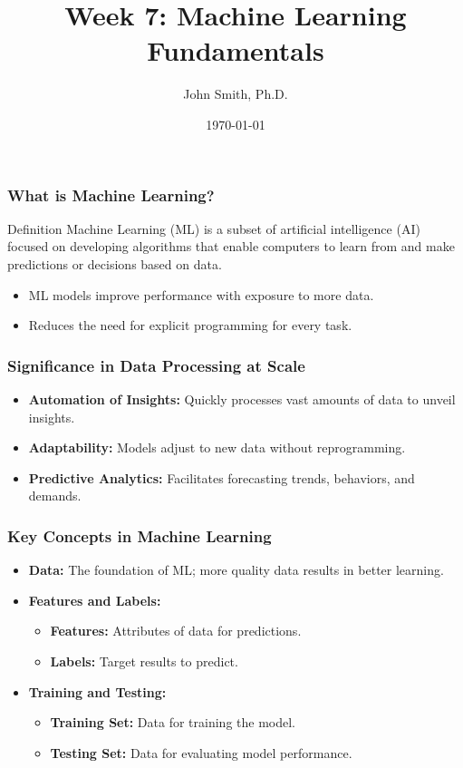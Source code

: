 \documentclass[aspectratio=169]{beamer}
\title[Machine Learning Fundamentals]{Week 7: Machine Learning Fundamentals}
\author[J. Smith]{John Smith, Ph.D.}
\institute[University Name]{
  Department of Computer Science\\
  University Name\\
  \vspace{0.3cm}
  Email: email@university.edu\\
  Website: www.university.edu
}
\date{\today}
\begin{document}
\frame{\titlepage}

\begin{frame}[fragile]
    \titlepage
\end{frame}

\begin{frame}[fragile]
    \frametitle{What is Machine Learning?}
    \begin{block}{Definition}
        Machine Learning (ML) is a subset of artificial intelligence (AI) focused on developing algorithms that enable computers to learn from and make predictions or decisions based on data. 
    \end{block}
    \begin{itemize}
        \item ML models improve performance with exposure to more data.
        \item Reduces the need for explicit programming for every task.
    \end{itemize}
\end{frame}

\begin{frame}[fragile]
    \frametitle{Significance in Data Processing at Scale}
    \begin{itemize}
        \item \textbf{Automation of Insights:} Quickly processes vast amounts of data to unveil insights.
        \item \textbf{Adaptability:} Models adjust to new data without reprogramming.
        \item \textbf{Predictive Analytics:} Facilitates forecasting trends, behaviors, and demands.
    \end{itemize}
\end{frame}

\begin{frame}[fragile]
    \frametitle{Key Concepts in Machine Learning}
    \begin{itemize}
        \item \textbf{Data:} The foundation of ML; more quality data results in better learning.
        \item \textbf{Features and Labels:}
            \begin{itemize}
                \item \textbf{Features:} Attributes of data for predictions.
                \item \textbf{Labels:} Target results to predict.
            \end{itemize}
        \item \textbf{Training and Testing:}
            \begin{itemize}
                \item \textbf{Training Set:} Data for training the model.
                \item \textbf{Testing Set:} Data for evaluating model performance.
            \end{itemize}
    \end{itemize}
\end{frame}
\end{document}
